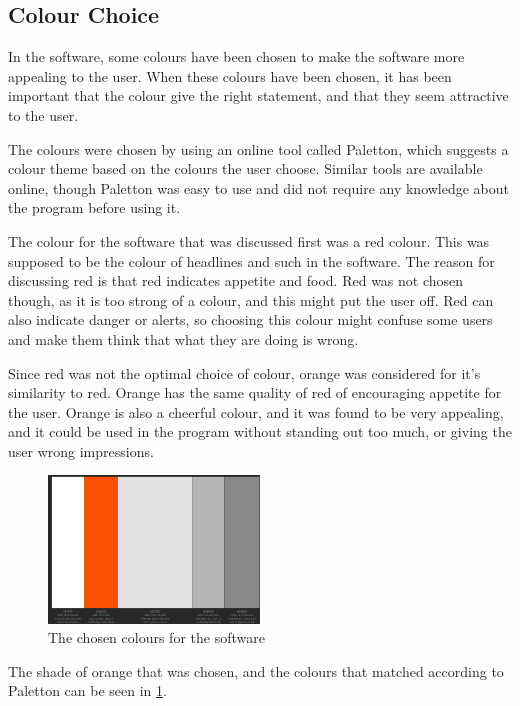 \subsection{Colour Choice}

In the software, some colours have been chosen to make the software more appealing to the user. When these colours have been chosen, it has been important that the colour give the right statement, and that they seem attractive to the user.

The colours were chosen by using an online tool called Paletton\cite{paletton}, which suggests a colour theme based on the colours the user choose. Similar tools are available online, though Paletton was easy to use and did not require any knowledge about the program before using it.

The colour for the software that was discussed first was a red colour. This was supposed to be the colour of headlines and such in the software. The reason for discussing red is that red indicates appetite and food\cite{color_psychology}. Red was not chosen though, as it is too strong of a colour, and this might put the user off. Red can also indicate danger or alerts, so choosing this colour might confuse some users and make them think that what they are doing is wrong.

Since red was not the optimal choice of colour, orange was considered for it's similarity to red. Orange has the same quality of red of encouraging appetite for the user. Orange is also a cheerful colour, and it was found to be very appealing, and it could be used in the program without standing out too much, or giving the user wrong impressions.

\begin{figure}[H]
	\centering
    \includegraphics[width=0.5\textwidth]{Grafik/FoodPlanner/ChosenColours}
	\caption{The chosen colours for the software}
	\label{ChosenColours}
\end{figure}

The shade of orange that was chosen, and the colours that matched according to Paletton can be seen in \cref{ChosenColours}.

